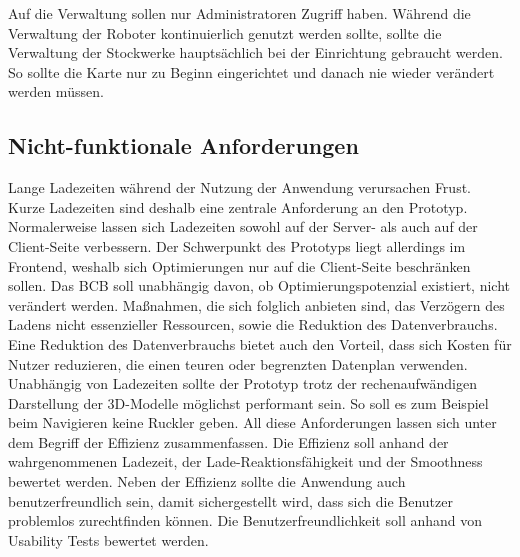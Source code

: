 Auf die Verwaltung sollen nur Administratoren Zugriff haben. Während die Verwaltung der Roboter kontinuierlich genutzt werden sollte, sollte die Verwaltung der Stockwerke hauptsächlich bei der Einrichtung gebraucht werden. So sollte die Karte nur zu Beginn eingerichtet und danach nie wieder verändert werden müssen.

\subsection{Nicht-funktionale Anforderungen}
Lange Ladezeiten während der Nutzung der Anwendung verursachen Frust. Kurze Ladezeiten sind deshalb eine zentrale Anforderung an den Prototyp. Normalerweise lassen sich Ladezeiten sowohl auf der Server- als auch auf der Client-Seite verbessern. Der Schwerpunkt des Prototyps liegt allerdings im Frontend, weshalb sich Optimierungen nur auf die Client-Seite beschränken sollen. Das \ac{BCB} soll unabhängig davon, ob Optimierungspotenzial existiert, nicht verändert werden. Maßnahmen, die sich folglich anbieten sind, das Verzögern des Ladens nicht essenzieller Ressourcen, sowie die Reduktion des Datenverbrauchs. Eine Reduktion des Datenverbrauchs bietet auch den Vorteil, dass sich Kosten für Nutzer reduzieren, die einen teuren oder begrenzten Datenplan verwenden. Unabhängig von Ladezeiten sollte der Prototyp trotz der rechenaufwändigen Darstellung der 3D-Modelle möglichst performant sein. So soll es zum Beispiel beim Navigieren keine Ruckler geben. All diese Anforderungen lassen sich unter dem Begriff der Effizienz zusammenfassen. Die Effizienz soll anhand der wahrgenommenen Ladezeit, der Lade-Reaktionsfähigkeit und der Smoothness bewertet werden. Neben der Effizienz sollte die Anwendung auch benutzerfreundlich sein, damit sichergestellt wird, dass sich die Benutzer problemlos zurechtfinden können. Die Benutzerfreundlichkeit soll anhand von Usability Tests bewertet werden.
